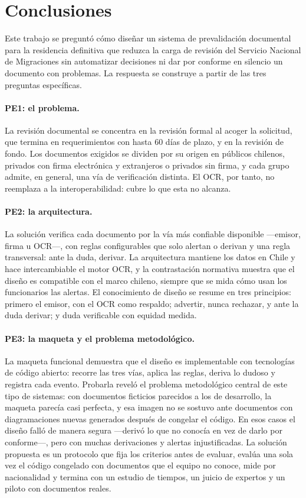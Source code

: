 \documentclass[11pt,a4paper]{article}
\begin{document}
\section{Conclusiones}

Este trabajo se preguntó cómo diseñar un sistema de prevalidación documental para la residencia definitiva que reduzca la carga de revisión del Servicio Nacional de Migraciones sin automatizar decisiones ni dar por conforme en silencio un documento con problemas. La respuesta se construye a partir de las tres preguntas específicas.

\paragraph{PE1: el problema.} La revisión documental se concentra en la revisión formal al acoger la solicitud, que termina en requerimientos con hasta 60 días de plazo, y en la revisión de fondo. Los documentos exigidos se dividen por su origen en públicos chilenos, privados con firma electrónica y extranjeros o privados sin firma, y cada grupo admite, en general, una vía de verificación distinta. El OCR, por tanto, no reemplaza a la interoperabilidad: cubre lo que esta no alcanza.

\paragraph{PE2: la arquitectura.} La solución verifica cada documento por la vía más confiable disponible ---emisor, firma u OCR---, con reglas configurables que solo alertan o derivan y una regla transversal: ante la duda, derivar. La arquitectura mantiene los datos en Chile y hace intercambiable el motor OCR, y la contrastación normativa muestra que el diseño es compatible con el marco chileno, siempre que se mida cómo usan los funcionarios las alertas. El conocimiento de diseño se resume en tres principios: primero el emisor, con el OCR como respaldo; advertir, nunca rechazar, y ante la duda derivar; y duda verificable con equidad medida.

\paragraph{PE3: la maqueta y el problema metodológico.} La maqueta funcional demuestra que el diseño es implementable con tecnologías de código abierto: recorre las tres vías, aplica las reglas, deriva lo dudoso y registra cada evento. Probarla reveló el problema metodológico central de este tipo de sistemas: con documentos ficticios parecidos a los de desarrollo, la maqueta parecía casi perfecta, y esa imagen no se sostuvo ante documentos con diagramaciones nuevas generados después de congelar el código. En esos casos el diseño falló de manera segura ---derivó lo que no conocía en vez de darlo por conforme---, pero con muchas derivaciones y alertas injustificadas. La solución propuesta es un protocolo que fija los criterios antes de evaluar, evalúa una sola vez el código congelado con documentos que el equipo no conoce, mide por nacionalidad y termina con un estudio de tiempos, un juicio de expertos y un piloto con documentos reales.
\end{document}

